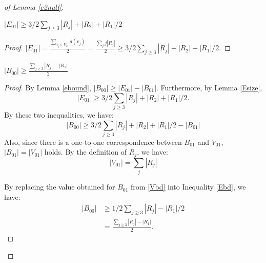 \begin{proof}[of Lemma \ref{c2null}]
\begin{lemma}
\label{Esize}
$|E_{01}| \geq 3/2 \sum_{j \geq 3}|R_j| + |R_2| + |R_1|/2$ 
\end{lemma}
\begin{proof}
$|E_{01}| = \frac{\sum_{v_j \in V_{01}} d(v_j)}{2} = \frac{\sum_j j|R_j|}{2} \geq 3/2 \sum_{j \geq 3}|R_j| + |R_2| + |R_1|/2.$
\end{proof}

\begin{lemma}
\label{B00size}
$|B_{00}| \geq \frac{\sum_{j \geq 3}|R_j| - |R_1|}{2}$
\end{lemma}
\begin{proof}
By Lemma \ref{ebound}, $|B_{00}| \geq |E_{01}| - |B_{01}| $. Furthermore, by Lemma \ref{Esize}, $$|E_{01}| \geq 3/2 \sum_{j \geq 3}|R_j| + |R_2| + |R_1|/2.$$ By these two inequalities, we have:
\begin{equation}
\label{Ebd}
|B_{00}| \geq 3/2 \sum_{j \geq 3}|R_j| + |R_2| + |R_1|/2 - |B_{01}| 
\end{equation}
Also, since there is a one-to-one correspondence between $B_{01}$ and $V_{01}$, $|B_{01}| = |V_{01}|$ holds. By the definition of $R_j$, we have: 
\begin{equation}
\label{Vbd}
|V_{01}| = \sum_j |R_j| 
\end{equation}

By replacing the value obtained for $B_{01}$ from \eqref{Vbd} into Inequality \eqref{Ebd}, we have:
\begin{equation}
\begin{split}
|B_{00}| &\geq 1/2 \sum_{j \geq 3}|R_j| - |R_1|/2 \\
& = \frac{\sum_{j \geq 3}|R_j| - |R_1|}{2}.
\end{split} 
\end{equation}
  
\end{proof}




\end{proof}
